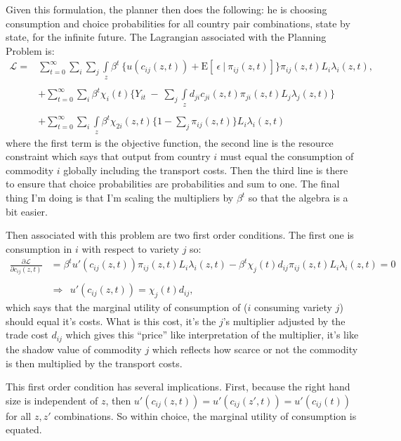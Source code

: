 \documentclass[12pt,pdftex]{article}
\begin{document}
\begin{onehalfspacing}
Given this formulation, the planner then does the following: he is choosing consumption and choice probabilities for all country pair combinations, state by state, for the infinite future. The Lagrangian associated with the Planning Problem is:
\begin{align}
\mathcal{L}  = & \sum_{t=0}^{\infty}   \sum_{i} \sum_{j} \int\limits_{z}  \beta^{t} \  \bigg \{  u(c_{ij}(z, t) ) + \mathrm{E}[ \ \epsilon \ | \ \pi_{ij}(z,t) ] \bigg \}\pi_{ij}(z,t) L_{i} \lambda_{i}(z, t), \\
\nonumber \\
&+ \sum_{t=0}^{\infty} \sum_{i} \beta^{t} \chi_{i}(t) \bigg \{ Y_{it} \  - \ \sum_{j} \int\limits_{z}  d_{ji} c_{ji}(z, t) \pi_{ji}(z,t) L_{j}\lambda_{j}(z, t) \bigg \} \nonumber \\
\nonumber \\
&+ \sum_{t=0}^{\infty} \sum_{i} \int\limits_{z}  \beta^{t} \chi_{2i}(z,t) \bigg \{1 - \sum_{j}\pi_{ij}(z,t) \bigg \} L_{i} \lambda_{i}(z, t) \nonumber
\label{eq:planning-problem}
\end{align}
where the first term is the objective function, the second line is the resource constraint which says that output from country $i$ must equal the consumption of commodity $i$ globally including the transport costs. Then the third line is there to ensure that choice probabilities are probabilities and sum to one. The final thing I'm doing is that I'm scaling the multipliers by $\beta^t$ so that the algebra is a bit easier.

Then associated with this problem are two first order conditions. The first one is consumption in $i$ with respect to variety $j$ so:
\begin{align}
\frac{\partial \mathcal{L} }{\partial c_{ij}(z, t)} &=  \beta^{t} u'(c_{ij}(z, t)) \pi_{ij}(z,t) L_{i} \lambda_{i}(z, t) - \beta^{t} \chi_{j}(t) d_{ij} \pi_{ij}(z,t) L_{i} \lambda_{i}(z, t) = 0 \\
\nonumber \\
& \Rightarrow \ \ u'(c_{ij}(z, t) ) = \chi_{j}(t) d_{ij},
\end{align}
which says that the marginal utility of consumption of ($i$ consuming variety $j$) should equal it's costs. What is this cost, it's the $j$'s multiplier adjusted by the trade cost $d_{ij}$ which gives this ``price'' like interpretation of the multiplier, it's like the shadow value of commodity $j$ which reflects how scarce or not the commodity is then multiplied by the transport costs.

This first order condition has several implications. First, because the right hand size is independent of $z$, then $u'(c_{ij}(z, t)) = u'(c_{ij}(z', t)) = u'(c_{ij}(t))$ for all $z, z'$ combinations. So within choice, the marginal utility of consumption is equated.


\end{onehalfspacing}
\end{document}
